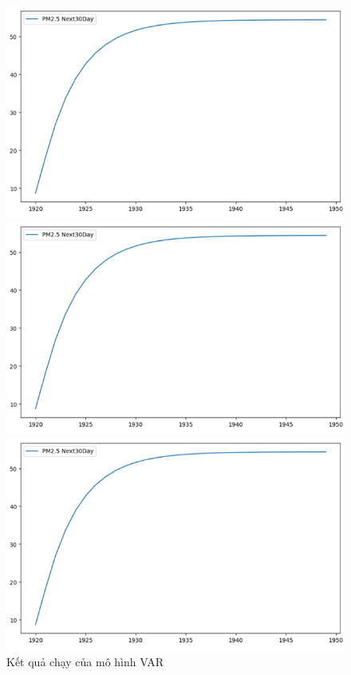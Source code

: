 \begin{figure}[H]
    \begin{minipage}{0.15\textwidth}
    \centering
    \includegraphics[width=1\textwidth]{img/final/VAR/VAR_7_3_HN_30D.png}
    \end{minipage}
    \hfill
    \begin{minipage}{0.15\textwidth}
    \centering
    \includegraphics[width=1\textwidth]{img/final/VAR/VAR_7_3_HN_30D.png}
    \end{minipage}
    \hfill
    \begin{minipage}{0.15\textwidth}
    \centering
    \includegraphics[width=1\textwidth]{img/final/VAR/VAR_7_3_HN_30D.png}
    \end{minipage}
    \hfill
    
    \caption{Kết quả chạy của mô hình VAR}
    \label{fig:VAR}
\end{figure}
